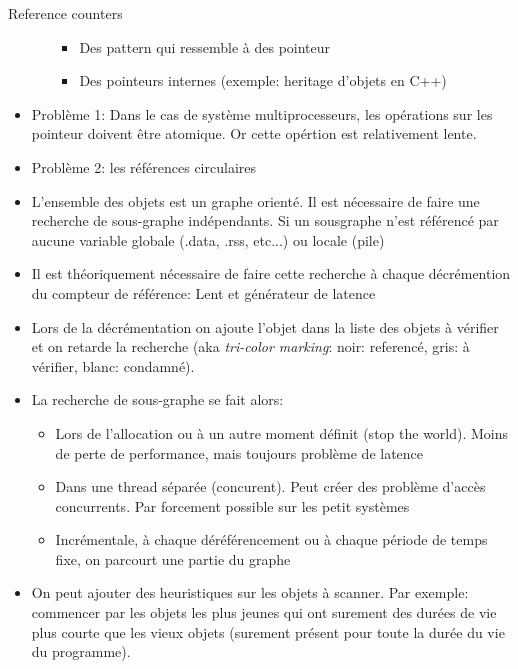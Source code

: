 \begin{frame}[fragile=singleslide]{Reference counters}
\begin{itemize}
\begin{itemize}
      \begin{itemize} 
      \item Des pattern qui ressemble à des pointeur
      \item Des pointeurs internes (exemple: heritage d'objets en C++)
      \end{itemize} 
    \end{itemize}
  \item  Problème 1:  Dans  le cas  de  système multiprocesseurs,  les
    opérations  sur  les  pointeur  doivent être  atomique.  Or  cette
    opértion est relativement lente.
  \item Problème 2: les références circulaires
  \item L'ensemble des objets est un graphe orienté. Il est nécessaire
    de  faire  une  recherche   de  sous-graphe  indépendants.  Si  un
    sousgraphe  n'est référencé  par aucune  variable  globale (.data,
    .rss, etc...) ou locale (pile)
  \item  Il est théoriquement  nécessaire de  faire cette  recherche à
    chaque décrémention  du compteur de référence:  Lent et générateur
    de latence
   \item Lors de la décrémentation on ajoute l'objet dans la liste des
     objets à vérifier et on retarde la recherche (aka \emph{tri-color
       marking}: noir: referencé, gris: à vérifier, blanc: condamné).
     \item La recherche de sous-graphe se fait alors:
       \begin{itemize} 
       \item Lors de  l'allocation ou à un autre  moment définit (stop
         the  world). Moins  de  perte de  performance, mais  toujours
         problème de latence
       \item  Dans  une thread  séparée  (concurent).  Peut créer  des
         problème d'accès concurrents.  Par forcement possible sur les
         petit systèmes
       \item  Incrémentale,  à  chaque  déréférencement  ou  à  chaque
         période de temps fixe, on parcourt une partie du graphe
  \end{itemize}
\item On peut  ajouter des heuristiques sur les  objets à scanner. Par
  exemple: commencer par  les objets les plus jeunes  qui ont surement
  des durées de vie plus courte que les vieux objets (surement présent
  pour toute la durée du vie du programme).
\end{itemize}
\end{frame} 


